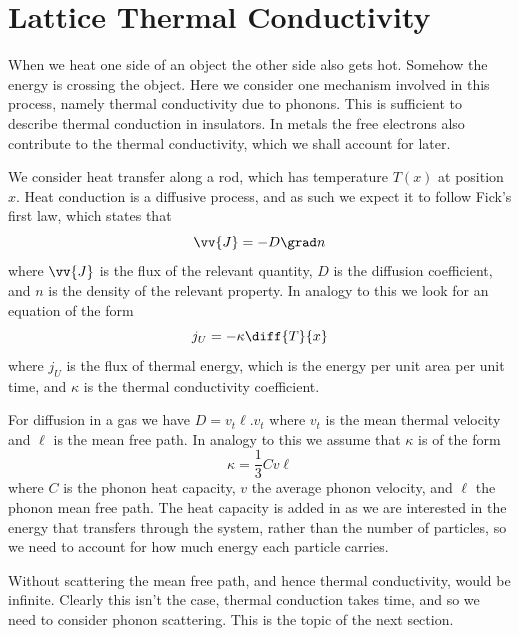 \documentclass[fleqn]{NotesClass}
\begin{document}
    \section{Lattice Thermal Conductivity}\label{sec:lattice thermal conductivity}
    When we heat one side of an object the other side also gets hot.
    Somehow the energy is crossing the object.
    Here we consider one mechanism involved in this process, namely thermal conductivity due to phonons.
    This is sufficient to describe thermal conduction in insulators.
    In metals the free electrons also contribute to the thermal conductivity, which we shall account for later.
    
    We consider heat transfer along a rod, which has temperature \(T(x)\) at position \(x\).
    Heat conduction is a diffusive process, and as such we expect it to follow Fick's first law, which states that
    \begin{equation}
        \vv{J} = -D\grad n
    \end{equation}
    where \(\vv{J}\) is the flux of the relevant quantity, \(D\) is the diffusion coefficient, and \(n\) is the density of the relevant property.
    In analogy to this we look for an equation of the form
    \begin{equation}
        j_U = -\kappa \diff{T}{x}
    \end{equation}
    where \(j_U\) is the flux of thermal energy, which is the energy per unit area per unit time, and \(\kappa\) is the thermal conductivity coefficient.
    
    For diffusion in a gas we have \(D = v_t\ell.v_t\) where \(v_t\) is the mean thermal velocity and \(\ell\) is the mean free path.
    In analogy to this we assume that \(\kappa\) is of the form
    \begin{equation}
        \kappa = \frac{1}{3}Cv\ell
    \end{equation}
    where \(C\) is the phonon heat capacity, \(v\) the average phonon velocity, and \(\ell\) the phonon mean free path.
    The heat capacity is added in as we are interested in the energy that transfers through the system, rather than the number of particles, so we need to account for how much energy each particle carries.
    
    Without scattering the mean free path, and hence thermal conductivity, would be infinite.
    Clearly this isn't the case, thermal conduction takes time, and so we need to consider phonon scattering.
    This is the topic of the next section.
    
\end{document}
